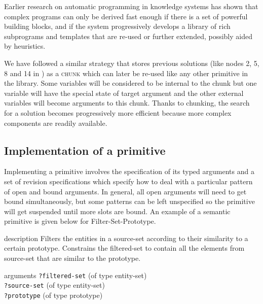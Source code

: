 \label{s:irl-chunking}

Earlier research on automatic programming in knowledge systems
\citep[see e.g.][]{barstow79knowledge} has shown that complex programs
can only be derived fast enough if there is a set of powerful building
blocks, and if the system progressively develops a library of rich
subprograms and templates that are re-used or further extended,
possibly aided by heuristics.

We have followed a similar strategy that stores previous solutions
(like nodes 2, 5, 8 and 14 in ) as a
\textsc{chunk} which can later be re-used like any other primitive in
the library. Some variables will be considered to be internal to the
chunk but one variable will have the special state of target argument
and the other external variables will become arguments to this
chunk. Thanks to chunking, the search for a solution becomes
progressively more efficient because more complex components are
readily available.

\subsection{Implementation of a primitive}

Implementing a primitive involves the specification of its typed
arguments and a set of revision specifications which specify how to
deal with a particular pattern of open and bound arguments. In
general, all open arguments will need to get bound simultaneously, but
some patterns can be left unspecified so the primitive will get
suspended until more slots are bound. An example of a semantic
primitive is given below for {\sc Filter-Set-Prototype}.


\begin{explanation}{description}
  Filters the entities in a source-set according to their similarity
  to a certain prototype. Constrains the filtered-set to contain all
  the elements from source-set that are similar to the prototype.
\end{explanation}

\begin{explanation}{arguments}
\verb+?filtered-set+ (of type entity-set) \\
\verb+?source-set+ (of type entity-set) \\
\verb+?prototype+ (of type prototype)
\end{explanation}

